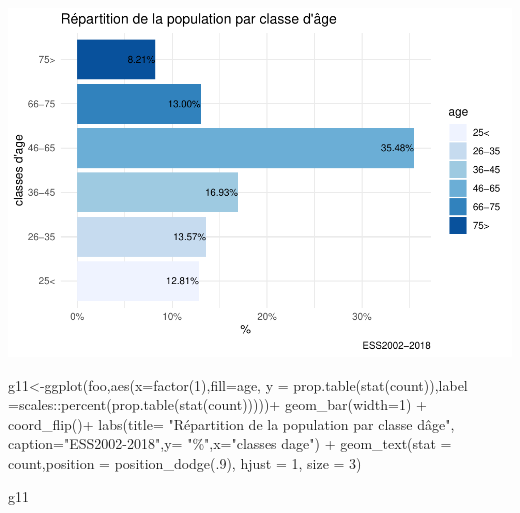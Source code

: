 \documentclass[
]{book}
\newenvironment{Shaded}{\begin{snugshade}}{\end{snugshade}}
\newcommand{\AttributeTok}[1]{\textcolor[rgb]{0.77,0.63,0.00}{#1}}
\newcommand{\DecValTok}[1]{\textcolor[rgb]{0.00,0.00,0.81}{#1}}
\newcommand{\FunctionTok}[1]{\textcolor[rgb]{0.00,0.00,0.00}{#1}}
\newcommand{\NormalTok}[1]{#1}
\newcommand{\OtherTok}[1]{\textcolor[rgb]{0.56,0.35,0.01}{#1}}
\newcommand{\SpecialCharTok}[1]{\textcolor[rgb]{0.00,0.00,0.00}{#1}}
\newcommand{\StringTok}[1]{\textcolor[rgb]{0.31,0.60,0.02}{#1}}
\begin{document}
\includegraphics{bookdown-demo_files/figure-latex/309-1.pdf}

\begin{Shaded}
\begin{Highlighting}[]
\NormalTok{g11}\OtherTok{\textless{}{-}}\FunctionTok{ggplot}\NormalTok{(foo,}\FunctionTok{aes}\NormalTok{(}\AttributeTok{x=}\FunctionTok{factor}\NormalTok{(}\DecValTok{1}\NormalTok{),}\AttributeTok{fill=}\NormalTok{age, }\AttributeTok{y =} \FunctionTok{prop.table}\NormalTok{(}\FunctionTok{stat}\NormalTok{(count)),}\AttributeTok{label =}\NormalTok{scales}\SpecialCharTok{::}\FunctionTok{percent}\NormalTok{(}\FunctionTok{prop.table}\NormalTok{(}\FunctionTok{stat}\NormalTok{(count)))))}\SpecialCharTok{+}
  \FunctionTok{geom\_bar}\NormalTok{(}\AttributeTok{width=}\DecValTok{1}\NormalTok{) }\SpecialCharTok{+}  
  \FunctionTok{coord\_flip}\NormalTok{()}\SpecialCharTok{+} 
  \FunctionTok{labs}\NormalTok{(}\AttributeTok{title=} \StringTok{"Répartition de la population par classe d\textquotesingle{}âge"}\NormalTok{, }\AttributeTok{caption=}\StringTok{"ESS2002{-}2018"}\NormalTok{,}\AttributeTok{y=} \StringTok{"\%"}\NormalTok{,}\AttributeTok{x=}\StringTok{"classes d\textquotesingle{}age"}\NormalTok{) }\SpecialCharTok{+}
  \FunctionTok{geom\_text}\NormalTok{(}\AttributeTok{stat =} \StringTok{\textquotesingle{}count\textquotesingle{}}\NormalTok{,}\AttributeTok{position =} \FunctionTok{position\_dodge}\NormalTok{(.}\DecValTok{9}\NormalTok{),  }\AttributeTok{hjust =} \DecValTok{1}\NormalTok{, }\AttributeTok{size =} \DecValTok{3}\NormalTok{)}

\NormalTok{g11}
\end{Highlighting}
\end{Shaded}
\end{document}

